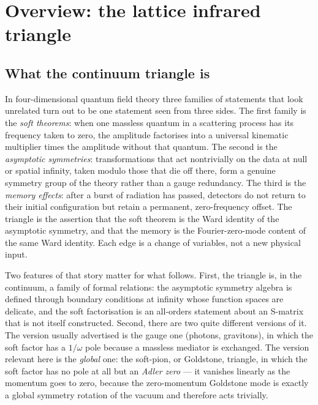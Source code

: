 
\section{Overview: the lattice infrared triangle}
\label{sec:overview}

\subsection{What the continuum triangle is}

In four-dimensional quantum field theory three families of statements that
look unrelated turn out to be one statement seen from three sides. The first
family is the \emph{soft theorems}: when one massless quantum in a scattering
process has its frequency taken to zero, the amplitude factorises into a
universal kinematic multiplier times the amplitude without that quantum. The
second is the \emph{asymptotic symmetries}: transformations that act
nontrivially on the data at null or spatial infinity, taken modulo those that
die off there, form a genuine symmetry group of the theory rather than a
gauge redundancy. The third is the \emph{memory effects}: after a burst of
radiation has passed, detectors do not return to their initial configuration
but retain a permanent, zero-frequency offset. The triangle is the assertion
that the soft theorem is the Ward identity of the asymptotic symmetry, and
that the memory is the Fourier-zero-mode content of the same Ward identity.
Each edge is a change of variables, not a new physical input.

Two features of that story matter for what follows. First, the triangle is,
in the continuum, a family of formal relations: the asymptotic symmetry
algebra is defined through boundary conditions at infinity whose function
spaces are delicate, and the soft factorisation is an all-orders statement
about an S-matrix that is not itself constructed. Second, there are two quite
different versions of it. The version usually advertised is the gauge one
(photons, gravitons), in which the soft factor has a $1/\omega$ pole because
a massless mediator is exchanged. The version relevant here is the
\emph{global} one: the soft-pion, or Goldstone, triangle, in which the soft
factor has no pole at all but an \emph{Adler zero} --- it vanishes linearly
as the momentum goes to zero, because the zero-momentum Goldstone mode is
exactly a global symmetry rotation of the vacuum and therefore acts trivially.

